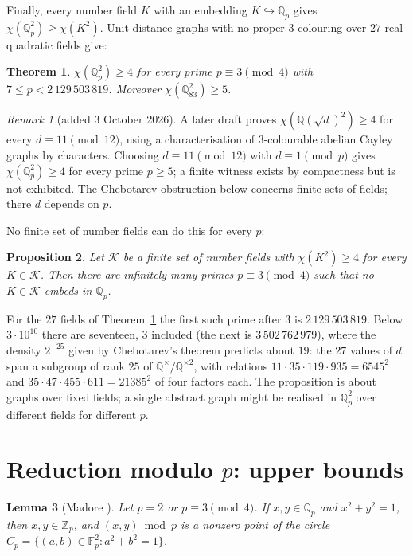 \documentclass[11pt,a4paper]{amsart}
\newtheorem{theorem}{Theorem}
\newtheorem{proposition}[theorem]{Proposition}
\newtheorem{lemma}[theorem]{Lemma}
\theoremstyle{remark}
\newtheorem*{remark}{Remark}
\newcommand{\F}{\mathbb{F}}
\newcommand{\Q}{\mathbb{Q}}
\newcommand{\Z}{\mathbb{Z}}
\begin{document}
Finally, every number field $K$ with an embedding $K\hookrightarrow\Q_p$ gives $\chi(\Q_p^2)\ge\chi(K^2)$.
Unit-distance graphs with no proper $3$-colouring over $27$ real quadratic fields \cite{QP} give:

\begin{theorem}\label{thm:D}
$\chi(\Q_p^2)\ge4$ for every prime $p\equiv3\pmod4$ with $7\le p<2\,129\,503\,819$. Moreover
$\chi(\Q_{83}^2)\ge5$.
\end{theorem}

\begin{remark}[added 3 October 2026]
A later draft \cite{FC} proves $\chi(\Q(\sqrt d)^2)\ge4$ for every $d\equiv11\pmod{12}$, using a characterisation of
$3$-colourable abelian Cayley graphs by characters. Choosing $d\equiv11\pmod{12}$ with $d\equiv1\pmod p$ gives
$\chi(\Q_p^2)\ge4$ for every prime $p\ge5$; a finite witness exists by compactness but is not exhibited. The
Chebotarev obstruction below concerns finite sets of fields; there $d$ depends on $p$.
\end{remark}

No finite set of number fields can do this for every $p$:

\begin{proposition}\label{prop:E}
Let $\mathcal K$ be a finite set of number fields with $\chi(K^2)\ge4$ for every $K\in\mathcal K$. Then there are
infinitely many primes $p\equiv3\pmod4$ such that no $K\in\mathcal K$ embeds in $\Q_p$.
\end{proposition}

For the $27$ fields of Theorem~\ref{thm:D} the first such prime after $3$ is $2\,129\,503\,819$. Below $3\cdot10^{10}$
there are seventeen, $3$ included (the next is $3\,502\,762\,979$), where the density $2^{-25}$ given by Chebotarev's
theorem predicts about $19$: the $27$ values of $d$ span a subgroup of rank $25$ of $\Q^\times/\Q^{\times2}$, with relations
$11\cdot35\cdot119\cdot935=6545^2$ and $35\cdot47\cdot455\cdot611=21385^2$ of four factors each. The proposition
is about graphs over fixed fields; a single abstract graph might be realised in $\Q_p^2$ over different fields for
different $p$.

\section{Reduction modulo \texorpdfstring{$p$}{p}: upper bounds}

\begin{lemma}[Madore {\cite[Propositions~3.2 and 3.8]{Madore}}]\label{lem:integral}
Let $p=2$ or $p\equiv3\pmod4$. If $x,y\in\Q_p$ and $x^2+y^2=1$, then $x,y\in\Z_p$, and $(x,y)\bmod p$ is a
nonzero point of the circle $C_p=\{(a,b)\in\F_p^2: a^2+b^2=1\}$.
\end{lemma}
\end{document}
